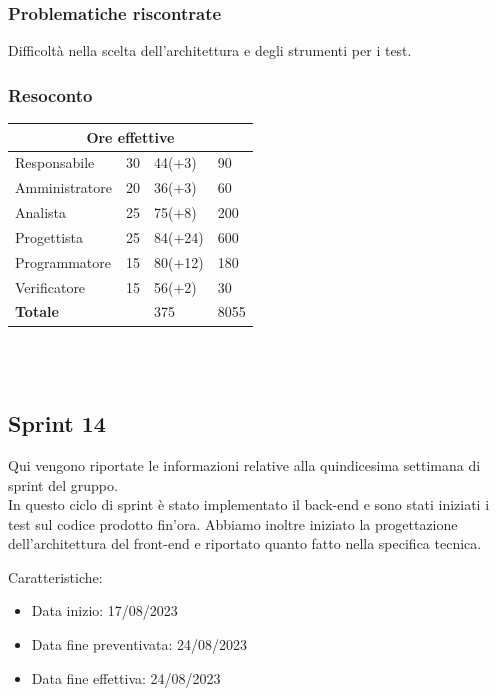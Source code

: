 \documentclass[9pt]{article}
\begin{document}
\subsubsection{Problematiche riscontrate}
Difficoltà nella scelta dell'architettura e degli strumenti per i test.


\subsubsection{Resoconto}
\begin{center}
	\begin{tabularx}{\textwidth}{|X|X|X|X|}
		\hline
		\multicolumn{4}{|c|}{\textbf{Ore effettive}}                                      \\
		\hline														
		Responsabile		&		30		&		44(+3)		&		90		\\
		\hline														
		Amministratore		&		20		&		36(+3)		&		60		\\
		\hline														
		Analista		&		25		&		75(+8)		&		200		\\
		\hline														
		Progettista		&		25		&		84(+24)		&		600		\\
		\hline														
		Programmatore		&		15		&		80(+12)		&		180		\\
		\hline														
		Verificatore		&		15		&		56(+2)		&		30		\\
		\hline														
		\hline														
		\textbf{Totale}		&				&		375		&		8055		\\
		\hline																										
	\end{tabularx}\\[8pt]
	\mbox{}\\
\end{center}

\subsection{Sprint 14}
Qui vengono riportate le informazioni relative alla quindicesima settimana di sprint del gruppo. \\
In questo ciclo di sprint è stato implementato il back-end e sono stati iniziati i test sul codice prodotto fin'ora.
Abbiamo inoltre iniziato la progettazione dell'architettura del front-end e riportato quanto fatto nella specifica tecnica. 

Caratteristiche:

\begin{itemize}
	\item Data inizio: 17/08/2023
	\item Data fine preventivata: 24/08/2023
	\item Data fine effettiva: 24/08/2023
\end{itemize}
\end{document}
